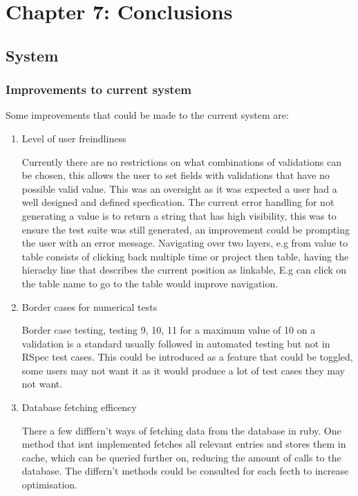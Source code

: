 \documentclass[a4paper,12pt]{article}
\begin{document}
\section{Chapter 7: Conclusions}

\subsection{System}

\subsubsection{Improvements to current system}

\par Some improvements that could be made to the current system are:
\begin{enumerate}
\item Level of user freindliness
\par Currently there are no restrictions on what combinations of validations can be chosen, this allows the user to set fields with validations that have no possible valid value. This was an oversight as it was expected a user had a well designed and defined specfication. The current error handling for not generating a value is to return a string that has high visibility, this was to ensure the test suite was still generated, an improvement could be prompting the user with an error message. Navigating over two layers, e.g from value to table consists of clicking back multiple time or project then table, having the hierachy line that describes the current position as linkable, E.g can click on the table name to go to the table would improve navigation.
\item Border cases for numerical tests
\par Border case testing, testing 9, 10, 11 for a maximum value of 10 on a validation is a standard usually followed in automated testing but not in RSpec test cases. This could be introduced as a feature that could be toggled, some users may not want it as it would produce a lot of test cases they may not want.
\item Database fetching efficency
\par There a few difffern't ways of fetching data from the database in ruby. One method that isnt implemented fetches all relevant entries and stores them in cache, which can be queried further on, reducing the amount of calls to the database. The differn't methods could be consulted for each fecth to increase optimisation.
\end{enumerate}
\end{document}
